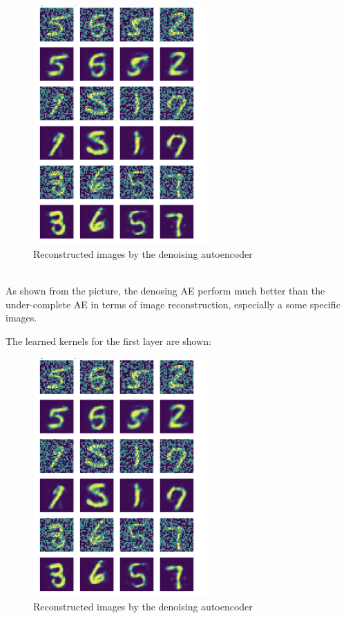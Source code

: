 \begin{figure}[H]
    \centering
    \includegraphics[width=0.6\textwidth]{labs/09/images/Denoising_AE.png}
    \caption{Reconstructed images by the denoising autoencoder}
    \label{fig:Denosing Autoencoder}
\end{figure}
\\

As shown from the picture, the denosing AE perform much better than the under-complete AE in terms of image reconstruction, especially a some specific images.

The learned kernels for the first layer are shown: 

\begin{figure}[H]
    \centering
    \includegraphics[width=0.6\textwidth]{labs/09/images/Denoising_AE.png}
    \caption{Reconstructed images by the denoising autoencoder}
    \label{fig:Denoising AE kernels}
\end{figure}
\\

